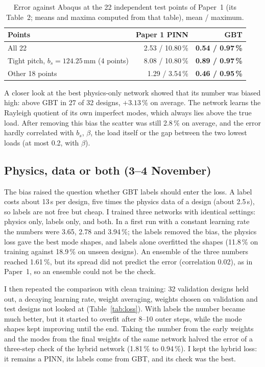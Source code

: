 \documentclass[11pt,a4paper]{article}
\newcommand{\pc}{\,\%}
\begin{document}
\begin{table}[h]
\centering\small
\caption{Error against Abaqus at the 22 independent test points of Paper~1 (its Table~2; means and maxima computed from that table), mean / maximum.}
\label{tab:abq}
\begin{tabular}{@{}lrr@{}}
\toprule
Points & Paper 1 PINN & GBT \\
\midrule
All 22 & 2.53 / 10.80\pc & \textbf{0.54 / 0.97\pc} \\
Tight pitch, $b_s=124.25$\,mm (4 points) & 8.08 / 10.80\pc & \textbf{0.89 / 0.97\pc} \\
Other 18 points & 1.29 / 3.54\pc & \textbf{0.46 / 0.95\pc} \\
\bottomrule
\end{tabular}
\end{table}

A closer look at the best physics-only network showed that its number was biased high: above GBT in 27 of 32 designs, $+3.13$\pc{} on average. The network learns the Rayleigh quotient of its own imperfect modes, which always lies above the true load. After removing this bias the scatter was still 2.8\pc{} on average, and the error hardly correlated with $b_s$, $\beta$, the load itself or the gap between the two lowest loads (at most 0.2, with $\beta$).

\subsection{Physics, data or both (3--4 November)}
The bias raised the question whether GBT labels should enter the loss. A label costs about 13\,s per design, five times the physics data of a design (about 2.5\,s), so labels are not free but cheap. I trained three networks with identical settings: physics only, labels only, and both. In a first run with a constant learning rate the numbers were 3.65, 2.78 and 3.94\pc; the labels removed the bias, the physics loss gave the best mode shapes, and labels alone overfitted the shapes (11.8\pc{} on training against 18.9\pc{} on unseen designs). An ensemble of the three numbers reached 1.61\pc, but its spread did not predict the error (correlation 0.02), as in Paper~1, so an ensemble could not be the check.

I then repeated the comparison with clean training: 32 validation designs held out, a decaying learning rate, weight averaging, weights chosen on validation and test designs not looked at (Table~\ref{tab:loss}). With labels the number became much better, but it started to overfit after 8--10 outer steps, while the mode shapes kept improving until the end. Taking the number from the early weights and the modes from the final weights of the same network halved the error of a three-step check of the hybrid network (1.81\pc{} to 0.94\pc). I kept the hybrid loss: it remains a PINN, its labels come from GBT, and its check was the best.
\end{document}
